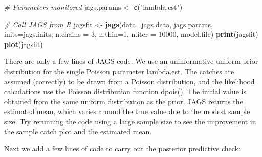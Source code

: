 \documentclass[
]{krantz}
\makeatletter
\newenvironment{Shaded}{\begin{snugshade}}{\end{snugshade}}
\newcommand{\AttributeTok}[1]{\textcolor[rgb]{0.27,0.27,0.27}{#1}}
\newcommand{\CommentTok}[1]{\textcolor[rgb]{0.37,0.37,0.37}{\textit{#1}}}
\newcommand{\DecValTok}[1]{\textcolor[rgb]{0.06,0.06,0.06}{#1}}
\newcommand{\FunctionTok}[1]{\textcolor[rgb]{0.27,0.27,0.27}{\textbf{#1}}}
\newcommand{\NormalTok}[1]{#1}
\newcommand{\OtherTok}[1]{\textcolor[rgb]{0.37,0.37,0.37}{#1}}
\newcommand{\StringTok}[1]{\textcolor[rgb]{0.5,0.5,0.5}{#1}}
\newenvironment{kframe}{%
\medskip{}
\setlength{\fboxsep}{.8em}
 \def\at@end@of@kframe{}%
 \ifinner\ifhmode%
  \def\at@end@of@kframe{\end{minipage}}%
  \begin{minipage}{\columnwidth}%
 \fi\fi%
 \def\FrameCommand##1{\hskip\@totalleftmargin \hskip-\fboxsep
 \colorbox{shadecolor}{##1}\hskip-\fboxsep
     \hskip-\linewidth \hskip-\@totalleftmargin \hskip\columnwidth}%
 \MakeFramed {\advance\hsize-\width
   \@totalleftmargin\z@ \linewidth\hsize
   \@setminipage}}%
 {\par\unskip\endMakeFramed%
 \at@end@of@kframe}
\renewenvironment{Shaded}{\begin{kframe}}{\end{kframe}}
\makeatother
\begin{document}
\begin{Shaded}
\begin{Highlighting}[]
\CommentTok{\# Parameters monitored}
\NormalTok{jags.params }\OtherTok{\textless{}{-}} \FunctionTok{c}\NormalTok{(}\StringTok{"lambda.est"}\NormalTok{)}

\CommentTok{\# Call JAGS from R}
\NormalTok{jagsfit }\OtherTok{\textless{}{-}} \FunctionTok{jags}\NormalTok{(}\AttributeTok{data=}\NormalTok{jags.data, jags.params, }\AttributeTok{inits=}\NormalTok{jags.inits,}
                \AttributeTok{n.chains =} \DecValTok{3}\NormalTok{, }\AttributeTok{n.thin=}\DecValTok{1}\NormalTok{, }\AttributeTok{n.iter =} \DecValTok{10000}\NormalTok{,}
\NormalTok{                model.file)}
\FunctionTok{print}\NormalTok{(jagsfit)}
\FunctionTok{plot}\NormalTok{(jagsfit)}
\end{Highlighting}
\end{Shaded}

There are only a few lines of JAGS code. We use an uninformative uniform prior distribution for the single Poisson parameter lambda.est. The catches are assumed (correctly) to be drawn from a Poisson distribution, and the likelihood calculations use the Poisson distribution function dpois(). The initial value is obtained from the same uniform distribution as the prior. JAGS returns the estimated mean, which varies around the true value due to the modest sample size. Try rerunning the code using a large sample size to see the improvement in the sample catch plot and the estimated mean.

Next we add a few lines of code to carry out the posterior predictive check:
\end{document}
